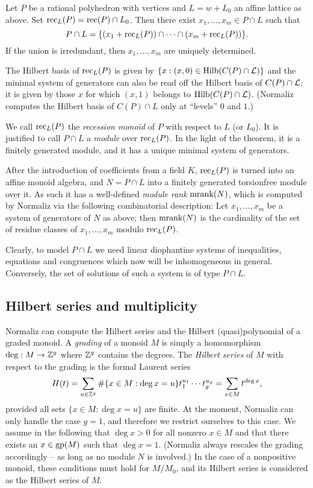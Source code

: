 \begin{theorem}
	Let $P$ be a rational polyhedron with vertices and $L=w+L_0$ an affine lattice as above. Set $\operatorname{rec}_L(P)=\operatorname{rec}(P)\cap L_0$. Then there exist $x_1,\dots,x_m\in P\cap L$ such that
	$$
	P\cap L=\{(x_1+\operatorname{rec}_L(P))\cap\dots\cap(x_m+\operatorname{rec}_L(P))\}.
	$$
	If the union is irredundant, then $x_1,\dots,x_m$ are uniquely determined.
\end{theorem}

The Hilbert basis of $\operatorname{rec}_L(P)$ is given by $\{x: (x,0)\in \operatorname{Hilb}(C(P)\cap{\mathcal L})\}$ and the minimal system of generators can also be read off the Hilbert basis of $C(P)\cap {\mathcal L}$: it is given by those $x$ for which $(x,1)$ belongs to $\operatorname{Hilb}(C(P)\cap{\mathcal L})$. (Normaliz computes the Hilbert basis of $C(P)\cap L$ only at ``levels'' $0$ and $1$.)

We call $\operatorname{rec}_L(P)$ the \emph{recession monoid} of $P$ with respect to $L$ (or $L_0$). It is justified to call $P\cap L$ a \emph{module} over $\operatorname{rec}_L(P)$. In the light of the theorem, it is a finitely generated module, and it has a unique minimal system of generators.

After the introduction of coefficients from a field $K$, $\operatorname{rec}_L(P)$ is turned into an affine monoid algebra, and $N=P\cap L$ into a finitely generated torsionfree module over it. As such it has a well-defined \emph{module rank} $\operatorname{mrank}(N)$, which is computed by Normaliz via the following combinatorial description: Let $x_1,\dots,x_m$ be a system of generators of $N$ as above; then $\operatorname{mrank}(N)$ is the cardinality of the set of residue classes of $x_1,\dots,x_m$ modulo $\operatorname{rec}_L(P)$.

Clearly, to model $P\cap L$ we need linear diophantine systems of inequalities, equations and congruences which now will be inhomogeneous in general. Conversely, the set of solutions of such a system is of type $P\cap L$.


\subsection{Hilbert series and multiplicity}\label{AppHilbertSeries}

Normaliz can compute the Hilbert series and the Hilbert
(quasi)polynomial of a graded monoid. A \emph{grading} of a
monoid $M$ is simply a homomorphism $\deg:M\to{\mathbb Z}^g$ where
${\mathbb Z}^g$ contains the degrees. The \emph{Hilbert series} of $M$
with respect to the grading is the formal Laurent series
$$
H(t)=\sum_{u\in {\mathbb Z}^g} \#\{x\in M: \deg x=u\}t_1^{u_1}\cdots t_g^{u_g}=\sum_{x\in M}t^{\deg x},
$$
provided all sets $\{x\in M: \deg x=u\}$ are finite. At the moment, Normaliz can only handle the case $g=1$, and therefore we restrict ourselves to this case. We assume in the following that $\deg x >0$ for all nonzero $x\in M$ and that there exists an $x\in\operatorname{gp}(M)$ such that $\deg x=1$. (Normaliz always rescales the grading accordingly -- as long as no module $N$ is involved.) In the case of a nonpositive monoid, these conditions must hold for $M/M_0$, and its Hilbert series is considered as the Hilbert series of $M$.


